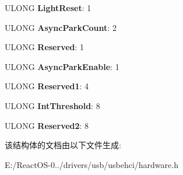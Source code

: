 \begin{DoxyCompactItemize}
U\+L\+O\+NG {\bfseries Light\+Reset}\+: 1
\item 
\mbox{\label{struct___e_h_c_i___u_s_b_c_m_d___c_o_n_t_e_n_t_a6499275f1ac6a5944d29c2a6987b4dda}} 
U\+L\+O\+NG {\bfseries Async\+Park\+Count}\+: 2
\item 
\mbox{\label{struct___e_h_c_i___u_s_b_c_m_d___c_o_n_t_e_n_t_a810e0f2474008e8dd7dd672aedc61d1b}} 
U\+L\+O\+NG {\bfseries Reserved}\+: 1
\item 
\mbox{\label{struct___e_h_c_i___u_s_b_c_m_d___c_o_n_t_e_n_t_afc253fd2bc1f4ba001c33b4edd19a3bb}} 
U\+L\+O\+NG {\bfseries Async\+Park\+Enable}\+: 1
\item 
\mbox{\label{struct___e_h_c_i___u_s_b_c_m_d___c_o_n_t_e_n_t_a9106540df426d105a27b091278a6a2ed}} 
U\+L\+O\+NG {\bfseries Reserved1}\+: 4
\item 
\mbox{\label{struct___e_h_c_i___u_s_b_c_m_d___c_o_n_t_e_n_t_a53fc99ac01f05899b8af641784a6b9b1}} 
U\+L\+O\+NG {\bfseries Int\+Threshold}\+: 8
\item 
\mbox{\label{struct___e_h_c_i___u_s_b_c_m_d___c_o_n_t_e_n_t_a6b3f7406d21ef432aaa10d8a2e9cf837}} 
U\+L\+O\+NG {\bfseries Reserved2}\+: 8
\end{DoxyCompactItemize}


该结构体的文档由以下文件生成\+:\begin{DoxyCompactItemize}
\item 
E\+:/\+React\+O\+S-\/0../drivers/usb/usbehci/hardware.\+h\end{DoxyCompactItemize}
